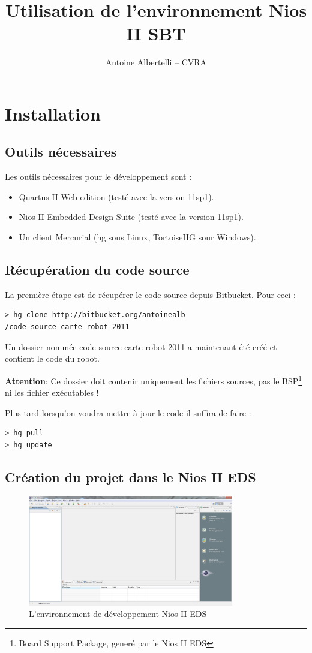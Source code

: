 \documentclass[a4paper]{report}
\author{Antoine Albertelli -- CVRA}
\title{Utilisation de l'environnement Nios II SBT}
\begin{document}
\maketitle
\tableofcontents
 
\chapter{Installation}
\section{Outils nécessaires}

Les outils nécessaires pour le développement sont :
\begin{itemize}
\item Quartus II Web edition (testé avec la version 11sp1).
\item Nios II Embedded Design Suite (testé avec la version 11sp1).
\item Un client Mercurial (hg sous Linux, TortoiseHG sour Windows).
\end{itemize}

\section{Récupération du code source}
La première étape est de récupérer le code source depuis Bitbucket.
Pour ceci :
\begin{lstlisting}[frame=trBL]
> hg clone http://bitbucket.org/antoinealb
/code-source-carte-robot-2011
\end{lstlisting}

Un dossier nommée code-source-carte-robot-2011 a maintenant été créé et contient le code du robot.

\textbf{Attention}: Ce dossier doit contenir uniquement les fichiers sources, pas le BSP\footnote{Board Support Package, generé par le Nios II EDS} ni les fichier exécutables !


Plus tard lorsqu'on voudra mettre à jour le code il suffira de faire :
\begin{lstlisting}[frame=trBL]
> hg pull
> hg update
\end{lstlisting}

\section{Création du projet dans le Nios II EDS}

\begin{figure}[h!]
  \centering
    \includegraphics[width=0.8\textwidth]{1}
  \caption{L'environnement de développement Nios II EDS}
\end{figure}
\end{document}
